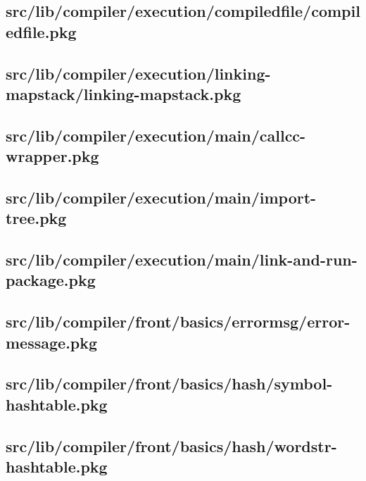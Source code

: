 \subsection{src/lib/compiler/execution/compiledfile/compiledfile.pkg}


\subsection{src/lib/compiler/execution/linking-mapstack/linking-mapstack.pkg}


\subsection{src/lib/compiler/execution/main/callcc-wrapper.pkg}


\subsection{src/lib/compiler/execution/main/import-tree.pkg}


\subsection{src/lib/compiler/execution/main/link-and-run-package.pkg}


\subsection{src/lib/compiler/front/basics/errormsg/error-message.pkg}


\subsection{src/lib/compiler/front/basics/hash/symbol-hashtable.pkg}


\subsection{src/lib/compiler/front/basics/hash/wordstr-hashtable.pkg}


